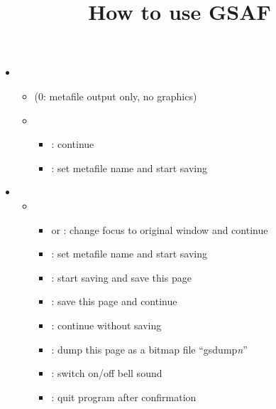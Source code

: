 \documentclass[12pt]{article}
\begin{document}
\title{How to use GSAF}
\begin{itemize}
\item
{}
\begin{itemize}
\item
{} (0: metafile output only, no graphics)
\item
{}
\begin{itemize}
\item
{}: continue
\item
{}: set metafile name and start saving
\end{itemize}
\end{itemize}
\item
{}
\begin{itemize}
\item
{}
\begin{itemize}
\item
{} or : change focus to original window and continue
\item
{}: set metafile name and start saving
\item
{}: start saving and save this page
\item
{}: save this page and continue
\item
{}: continue without saving
\item
{}: dump this page as a bitmap file ``gsdump\textit{n}''
\item
{}: switch on/off bell sound
\item
{}: quit program after confirmation
\end{itemize}
\end{itemize}
\end{itemize}
\end{document}
